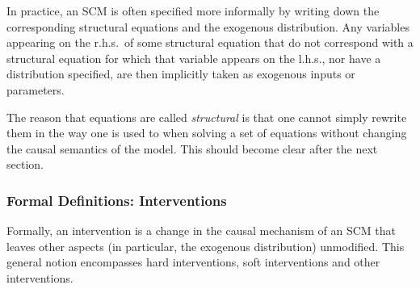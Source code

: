In practice, an SCM is often specified more informally by writing down the corresponding structural
equations  and the exogenous distribution. Any variables appearing
on the r.h.s.\ of some structural equation that do not correspond with a structural equation for which
that variable appears on the l.h.s., nor have a distribution specified, are then implicitly taken as
exogenous inputs or parameters.

The reason that equations  are called \emph{structural} is that one cannot simply rewrite them 
in the way one is used to when solving a set of equations without changing the causal semantics of 
the model. This should become clear after the next section.

\subsubsection{Formal Definitions: Interventions}

Formally, an intervention is a change in the causal mechanism of an SCM that
leaves other aspects (in particular, the exogenous distribution) unmodified.
This general notion encompasses hard interventions, soft interventions and other interventions. 


